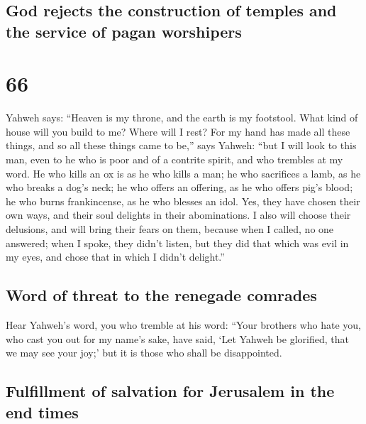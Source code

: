 \hypertarget{god-rejects-the-construction-of-temples-and-the-service-of-pagan-worshipers}{%
\subsection{God rejects the construction of temples and the service of
pagan
worshipers}\label{god-rejects-the-construction-of-temples-and-the-service-of-pagan-worshipers}}

\hypertarget{section-65}{%
\section{66}\label{section-65}}

 Yahweh says: ``Heaven is my throne, and the earth is my
footstool. What kind of house will you build to me? Where will I rest?
 For my hand has made all these things, and so all these
things came to be,'' says Yahweh: ``but I will look to this man, even to
he who is poor and of a contrite spirit, and who trembles at my word.
 He who kills an ox is as he who kills a man; he who
sacrifices a lamb, as he who breaks a dog's neck; he who offers an
offering, as he who offers pig's blood; he who burns frankincense, as he
who blesses an idol. Yes, they have chosen their own ways, and their
soul delights in their abominations.  I also will choose
their delusions, and will bring their fears on them, because when I
called, no one answered; when I spoke, they didn't listen, but they did
that which was evil in my eyes, and chose that in which I didn't
delight.''

\hypertarget{word-of-threat-to-the-renegade-comrades}{%
\subsection{Word of threat to the renegade
comrades}\label{word-of-threat-to-the-renegade-comrades}}

 Hear Yahweh's word, you who tremble at his word: ``Your
brothers who hate you, who cast you out for my name's sake, have said,
`Let Yahweh be glorified, that we may see your joy;' but it is those who
shall be disappointed.

\hypertarget{fulfillment-of-salvation-for-jerusalem-in-the-end-times}{%
\subsection{Fulfillment of salvation for Jerusalem in the end
times}\label{fulfillment-of-salvation-for-jerusalem-in-the-end-times}}

